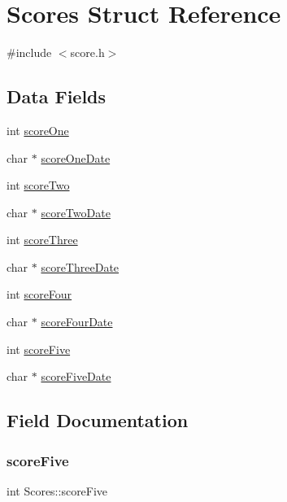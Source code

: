 \hypertarget{struct_scores}{}\section{Scores Struct Reference}
\label{struct_scores}


{\ttfamily \#include $<$score.\+h$>$}

\subsection*{Data Fields}
\begin{DoxyCompactItemize}
\item 
int \mbox{\hyperlink{struct_scores_a6aca31bb273b6fad076dc50a5a6e3a8e}{score\+One}}
\item 
char $\ast$ \mbox{\hyperlink{struct_scores_a5986b967a1bad15dd675bfa65365f842}{score\+One\+Date}}
\item 
int \mbox{\hyperlink{struct_scores_ac138adaf6d9c61b3e6c8ee88915c3c31}{score\+Two}}
\item 
char $\ast$ \mbox{\hyperlink{struct_scores_a6eb8b4bc814ae505d20c5c77c8e19c96}{score\+Two\+Date}}
\item 
int \mbox{\hyperlink{struct_scores_aec915cffa1ccb8645ad6ee54b359f687}{score\+Three}}
\item 
char $\ast$ \mbox{\hyperlink{struct_scores_a4e480e0715f82dc3e69dbcd87c6290af}{score\+Three\+Date}}
\item 
int \mbox{\hyperlink{struct_scores_ac054163467e4a504f597ff797c82d801}{score\+Four}}
\item 
char $\ast$ \mbox{\hyperlink{struct_scores_adf4634c7d0242005e8296f5ad771396a}{score\+Four\+Date}}
\item 
int \mbox{\hyperlink{struct_scores_af612fcb18aa267e7f2a870fab6e47078}{score\+Five}}
\item 
char $\ast$ \mbox{\hyperlink{struct_scores_a2969fd6fb35ea3cb390ac89b825bec99}{score\+Five\+Date}}
\end{DoxyCompactItemize}


\subsection{Field Documentation}
\mbox{\label{struct_scores_af612fcb18aa267e7f2a870fab6e47078}} 
\subsubsection{\texorpdfstring{scoreFive}{scoreFive}}
{\footnotesize\ttfamily int Scores\+::score\+Five}


